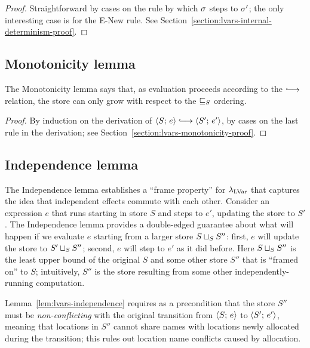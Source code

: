 \LVarsLemInternalDeterminism
\begin{proof}
  Straightforward by cases on the rule by which $\sigma$ steps to
  $\sigma'$; the only interesting case is for the {\sc E-New} rule.
  See Section~\ref{section:lvars-internal-determinism-proof}.
\end{proof}

\subsection{Monotonicity lemma}


The Monotonicity lemma says that, as evaluation proceeds according to
the $\parstepsto$ relation, the store can only grow with respect to
the $ \sqsubseteq_S $ ordering.

\LVarsLemMonotonicity
\begin{proof}
  By induction on the derivation of $\config{S}{e} \parstepsto
  \config{S'}{e'}$, by cases on the last rule in the derivation; see
  Section~\ref{section:lvars-monotonicity-proof}.
\end{proof}

\subsection{Independence lemma}\label{subsection:lvars-independence}


The Independence lemma establishes a ``frame property'' for
$\lambda_{\textrm{LVar}}$ that captures the idea that independent effects commute
with each other.  Consider an expression $e$ that runs starting in
store $S$ and steps to $e'$, updating the store to $S'$.  The
Independence lemma provides a double-edged guarantee about what will
happen if we evaluate $e$ starting from a larger store
$S \sqcup_{S} S''$: first, $e$ will update the store to
$S' \sqcup_{S} S''$; second, $e$ will step to $e'$ as it did before.
Here $S \sqcup_{S} S''$ is the least upper bound of the original $S$
and some other store $S''$ that is ``framed on'' to $S$; intuitively,
$S''$ is the store resulting from some other independently-running
computation.

Lemma~\ref{lem:lvars-independence} requires as a precondition that the
store $S''$ must be \emph{non-conflicting} with the original
transition from $\langle S;\, e \rangle$ to $\langle S';\, e' \rangle$, meaning that
locations in $S''$ cannot share names with locations newly allocated
during the transition; this rules out location name conflicts caused
by allocation.

